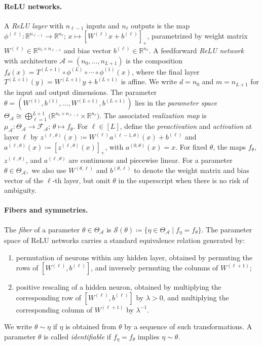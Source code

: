 \documentclass{article}
\theoremstyle{definition}
\newcommand{\R}{\mathbb{R}}
\newcommand{\architecture}{\mathcal{A}}
\newcommand{\paramspace}[1]{\Theta_{#1}}
\newcommand{\weights}[1]{W^{(#1)}}
\newcommand{\bias}[1]{b^{(#1)}}
\newcommand{\activation}[1]{a^{(#1)}}
\newcommand{\preactivation}[1]{z^{(#1)}}
\newcommand{\funspace}[1]{\mathcal{F}_{#1}}
\newcommand{\fiber}[1]{\mathcal{S}({#1})}
\begin{document}
\paragraph{ReLU networks.}
A \emph{ReLU layer} with $n_{\ell-1}$ inputs and $n_\ell$ outputs is the map 
$
\phi^{(\ell)} 
\colon \R^{n_{\ell-1}} \to \R^{n_\ell};\,
x \mapsto [\weights{\ell}x + \bias{\ell}]_+
$,
parametrized by weight matrix $\weights{\ell} \in \R^{n_\ell \times n_{\ell-1}}$ and bias vector $\bias{\ell}\in\R^{n_\ell}$. 
A feedforward \emph{ReLU network} with architecture
$\architecture=(n_0,\ldots,n_{L+1})$ 
is the composition
$f_\theta(x)
=
T^{(L+1)}
\circ
\phi^{(L)} 
\circ \cdots \circ
\phi^{(1)}
(x)$, 
where the final layer
$
T^{(L+1)}
(y)=\weights{L+1}y+\bias{L+1}
$
is affine. 
We write $d=n_0$ and $m=n_{L+1}$ for the input and output dimensions. 
The parameter 
$
\theta=(\weights{1},\bias{1},\dots,\weights{L+1},\bias{L+1})
$
lies in the \emph{parameter space} 
$
\paramspace{\architecture}
\cong
\bigoplus_{\ell=1}^{L+1}
\bigl(\R^{n_\ell\times n_{\ell-1}}\times\R^{n_\ell}\bigr)
$. 
The associated \emph{realization map} is
$
\mu_\architecture \colon \paramspace{\architecture} \to \funspace{\architecture};\,
\theta \mapsto f_\theta
$. 
For $\ell\in[L]$, define the \emph{preactivation} and \emph{activation} at layer $\ell$ by
$
\preactivation{\ell,\theta}(x)
\coloneqq
\weights{\ell}\activation{\ell-1,\theta}(x)+\bias{\ell}$ and 
$\activation{\ell,\theta}(x)
\coloneqq
[\preactivation{\ell,\theta}(x)]_+$, 
with $\activation{0,\theta}(x)=x$. 
For fixed $\theta$, the maps $f_\theta$, $\preactivation{\ell,\theta}$, and $\activation{\ell,\theta}$ are continuous and piecewise linear. For a parameter 
$
\theta \in \paramspace{\architecture},
$
we also use $\weights{\theta,\ell}$ and $\bias{\theta,\ell}$ to denote the weight matrix and bias vector of the $\ell$-th layer, but omit $\theta$ in the superscript when there is no risk of ambiguity. 

\paragraph{Fibers and symmetries.} 
The \emph{fiber} of a parameter $\theta\in\paramspace{\architecture}$ is 
$
\fiber{\theta}
\coloneqq
\{\eta\in\paramspace{\architecture}\mid f_\eta=f_\theta\}
$. 
The parameter space of ReLU networks carries a standard equivalence relation generated by: 
\begin{enumerate}[leftmargin=*]
    \item permutation of neurons within any hidden layer, obtained by permuting the rows of $[\weights{\ell},\bias{\ell}]$, and inversely permuting the columns of $\weights{\ell+1}$; 
    \item positive rescaling of a hidden neuron, obtained by multiplying the corresponding row of $[\weights{\ell},\bias{\ell}]$ by $\lambda>0$, and multiplying the corresponding column of $\weights{\ell+1}$ by $\lambda^{-1}$. 
\end{enumerate}
We write $\theta\sim\eta$ if $\eta$ is obtained from $\theta$ by a sequence of such transformations. 
A parameter $\theta$ is called \emph{identifiable} if
$f_\eta=f_\theta$ implies $\eta\sim\theta$. 
\end{document}
